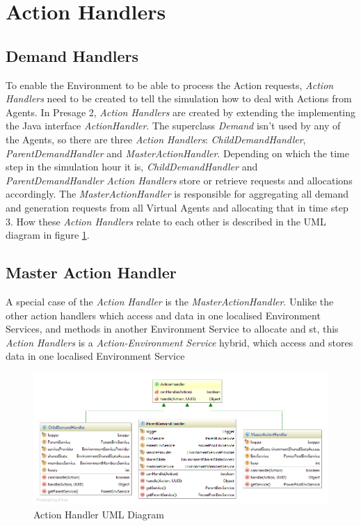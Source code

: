 \section*{Action Handlers} %
\subsection*{Demand Handlers}
To enable the Environment to be able to process the Action requests, \textit{Action Handlers} need to be created to tell the simulation how to deal with Actions from Agents. In Presage 2, \textit{Action Handlers} are created by extending the implementing the Java interface \textit{ActionHandler}. The superclass \textit{Demand} isn't used by any of the Agents, so there are three \textit{Action Handlers}:  \textit{ChildDemandHandler}, \textit{ParentDemandHandler} and \textit{MasterActionHandler}. Depending on which the time step in the simulation hour it is, \textit{ChildDemandHandler} and \textit{ParentDemandHandler} \textit{Action Handlers} store or retrieve requests and allocations accordingly. The \textit{MasterActionHandler} is responsible for aggregating all demand and generation requests from all Virtual Agents and allocating that in time step 3. How these \textit{Action Handlers} relate to each other is described in the UML diagram in figure \ref{fig:ActionHandlerUML}. 

\subsection*{Master Action Handler}
A special case of the \textit{Action Handler} is the \textit{MasterActionHandler}. Unlike the other action handlers which access and data in one localised Environment Services, and methods in another Environment Service to allocate and st, this \textit{Action Handlers} is a \textit{Action-Environment Service} hybrid, which access and stores data in one localised Environment Service

\begin{figure}[!h]
	\centering
	\includegraphics[scale=0.4]{Images/ActionHandlerUML.png}
	\caption{Action Handler UML Diagram}
	\label{fig:ActionHandlerUML}
\end{figure}

